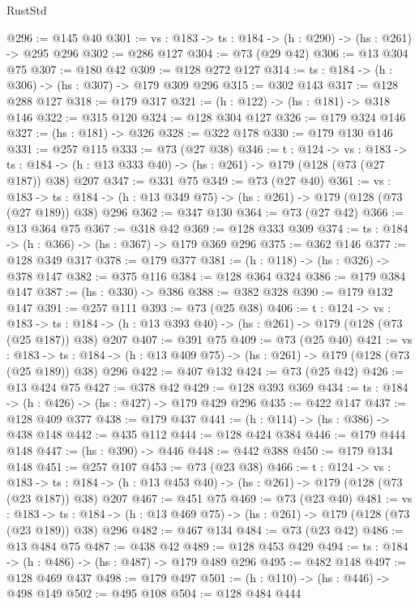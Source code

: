 \begin{lexlean}{RustStd}
\begin{coremodule}
{\begin{coremodule}
{{{{{@296 := @145 @40
@301 := {vs : @183} -> {ts : @184} -> (h : @290) -> (hs : @261) -> @295 @296
@302 := @286 @127
@304 := @73 (@29 @42)
@306 := @13 @304 @75
@307 := @180 @42
@309 := @128 @272 @127
@314 := {ts : @184} -> (h : @306) -> (hs : @307) -> @179 @309 @296
@315 := @302 @143
@317 := @128 @288 @127
@318 := @179 @317
@321 := (h : @122) -> (hs : @181) -> @318 @146
@322 := @315 @120
@324 := @128 @304 @127
@326 := @179 @324 @146
@327 := (hs : @181) -> @326
@328 := @322 @178
@330 := @179 @130 @146
@331 := @257 @115
@333 := @73 (@27 @38)
@346 := {t : @124} ->
  {vs : @183} ->
  {ts : @184} -> (h : @13 @333 @40) -> (hs : @261) -> @179 (@128 (@73 (@27 @187)) @38) @207
@347 := @331 @75
@349 := @73 (@27 @40)
@361 := {vs : @183} ->
  {ts : @184} -> (h : @13 @349 @75) -> (hs : @261) -> @179 (@128 (@73 (@27 @189)) @38) @296
@362 := @347 @130
@364 := @73 (@27 @42)
@366 := @13 @364 @75
@367 := @318 @42
@369 := @128 @333 @309
@374 := {ts : @184} -> (h : @366) -> (hs : @367) -> @179 @369 @296
@375 := @362 @146
@377 := @128 @349 @317
@378 := @179 @377
@381 := (h : @118) -> (hs : @326) -> @378 @147
@382 := @375 @116
@384 := @128 @364 @324
@386 := @179 @384 @147
@387 := (hs : @330) -> @386
@388 := @382 @328
@390 := @179 @132 @147
@391 := @257 @111
@393 := @73 (@25 @38)
@406 := {t : @124} ->
  {vs : @183} ->
  {ts : @184} -> (h : @13 @393 @40) -> (hs : @261) -> @179 (@128 (@73 (@25 @187)) @38) @207
@407 := @391 @75
@409 := @73 (@25 @40)
@421 := {vs : @183} ->
  {ts : @184} -> (h : @13 @409 @75) -> (hs : @261) -> @179 (@128 (@73 (@25 @189)) @38) @296
@422 := @407 @132
@424 := @73 (@25 @42)
@426 := @13 @424 @75
@427 := @378 @42
@429 := @128 @393 @369
@434 := {ts : @184} -> (h : @426) -> (hs : @427) -> @179 @429 @296
@435 := @422 @147
@437 := @128 @409 @377
@438 := @179 @437
@441 := (h : @114) -> (hs : @386) -> @438 @148
@442 := @435 @112
@444 := @128 @424 @384
@446 := @179 @444 @148
@447 := (hs : @390) -> @446
@448 := @442 @388
@450 := @179 @134 @148
@451 := @257 @107
@453 := @73 (@23 @38)
@466 := {t : @124} ->
  {vs : @183} ->
  {ts : @184} -> (h : @13 @453 @40) -> (hs : @261) -> @179 (@128 (@73 (@23 @187)) @38) @207
@467 := @451 @75
@469 := @73 (@23 @40)
@481 := {vs : @183} ->
  {ts : @184} -> (h : @13 @469 @75) -> (hs : @261) -> @179 (@128 (@73 (@23 @189)) @38) @296
@482 := @467 @134
@484 := @73 (@23 @42)
@486 := @13 @484 @75
@487 := @438 @42
@489 := @128 @453 @429
@494 := {ts : @184} -> (h : @486) -> (hs : @487) -> @179 @489 @296
@495 := @482 @148
@497 := @128 @469 @437
@498 := @179 @497
@501 := (h : @110) -> (hs : @446) -> @498 @149
@502 := @495 @108
@504 := @128 @484 @444
}}}}}
\end{coremodule}}
\end{coremodule}
\end{lexlean}
